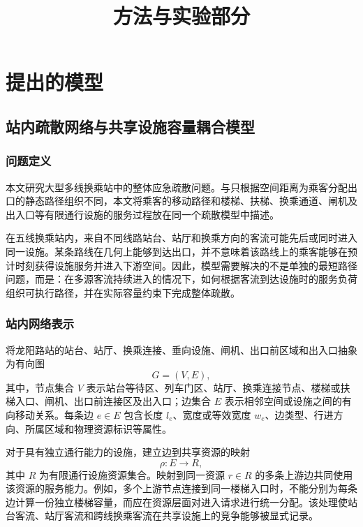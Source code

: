\documentclass[UTF8,a4paper,12pt]{ctexart}
\title{方法与实验部分}
\author{}
\date{}
\begin{document}
\maketitle

\setcounter{section}{2}

\section{提出的模型}

\subsection{站内疏散网络与共享设施容量耦合模型}

\subsubsection{问题定义}

本文研究大型多线换乘站中的整体应急疏散问题。与只根据空间距离为乘客分配出口的静态路径组织不同，本文将乘客的移动路径和楼梯、扶梯、换乘通道、闸机及出入口等有限通行设施的服务过程放在同一个疏散模型中描述。

在五线换乘站内，来自不同线路站台、站厅和换乘方向的客流可能先后或同时进入同一设施。某条路线在几何上能够到达出口，并不意味着该路线上的乘客能够在预计时刻获得设施服务并进入下游空间。因此，模型需要解决的不是单独的最短路径问题，而是：在多源客流持续进入的情况下，如何根据客流到达设施时的服务负荷组织可执行路径，并在实际容量约束下完成整体疏散。

\subsubsection{站内网络表示}

将龙阳路站的站台、站厅、换乘连接、垂向设施、闸机、出口前区域和出入口抽象为有向图
\[
G=(V,E),
\]
其中，节点集合 \(V\) 表示站台等待区、列车门区、站厅、换乘连接节点、楼梯或扶梯入口、闸机、出口前连接区及出入口；边集合 \(E\) 表示相邻空间或设施之间的有向移动关系。每条边 \(e\in E\) 包含长度 \(l_e\)、宽度或等效宽度 \(w_e\)、边类型、行进方向、所属区域和物理资源标识等属性。

对于具有独立通行能力的设施，建立边到共享资源的映射
\[
\rho:E\rightarrow R,
\]
其中 \(R\) 为有限通行设施资源集合。映射到同一资源 \(r\in R\) 的多条上游边共同使用该资源的服务能力。例如，多个上游节点连接到同一楼梯入口时，不能分别为每条边计算一份独立楼梯容量，而应在资源层面对进入请求进行统一分配。该处理使站台客流、站厅客流和跨线换乘客流在共享设施上的竞争能够被显式记录。
\end{document}
